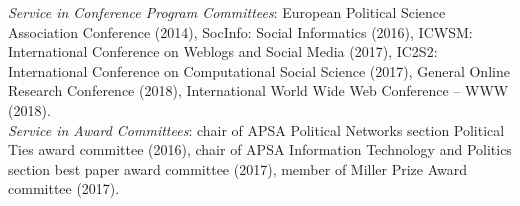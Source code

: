 \documentclass[margin,line,11pt]{resume}
\newcommand{\nl}{\vspace{0.10in}\\}
\begin{document}
\begin{resume}
\newpage

\emph{Service in Conference Program Committees}: European Political Science Association Conference (2014), SocInfo: Social Informatics (2016), ICWSM: International Conference on Weblogs and Social Media (2017), IC2S2: International Conference on Computational Social Science (2017), General Online Research Conference (2018),  International World Wide Web Conference
-- WWW (2018).\nl
\emph{Service in Award Committees}: chair of APSA Political Networks section Political Ties award committee (2016), chair of APSA Information Technology and Politics section best paper award committee (2017), member of Miller Prize Award committee (2017).



\end{resume}
\end{document}
